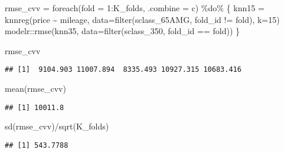\documentclass[
]{article}
\newenvironment{Shaded}{\begin{snugshade}}{\end{snugshade}}
\newcommand{\AttributeTok}[1]{\textcolor[rgb]{0.77,0.63,0.00}{#1}}
\newcommand{\DecValTok}[1]{\textcolor[rgb]{0.00,0.00,0.81}{#1}}
\newcommand{\FunctionTok}[1]{\textcolor[rgb]{0.00,0.00,0.00}{#1}}
\newcommand{\NormalTok}[1]{#1}
\newcommand{\OtherTok}[1]{\textcolor[rgb]{0.56,0.35,0.01}{#1}}
\newcommand{\SpecialCharTok}[1]{\textcolor[rgb]{0.00,0.00,0.00}{#1}}
\newcommand{\StringTok}[1]{\textcolor[rgb]{0.31,0.60,0.02}{#1}}
\begin{document}
\begin{Shaded}
\begin{Highlighting}[]
\NormalTok{rmse\_cvv }\OtherTok{=} \FunctionTok{foreach}\NormalTok{(}\AttributeTok{fold =} \DecValTok{1}\SpecialCharTok{:}\NormalTok{K\_folds, }\AttributeTok{.combine =} \StringTok{\textquotesingle{}c\textquotesingle{}}\NormalTok{) }\SpecialCharTok{\%do\%}\NormalTok{ \{}
\NormalTok{  knn15 }\OtherTok{=} \FunctionTok{knnreg}\NormalTok{(price }\SpecialCharTok{\textasciitilde{}}\NormalTok{ mileage, }\AttributeTok{data=}\FunctionTok{filter}\NormalTok{(sclass\_65AMG, fold\_id }\SpecialCharTok{!=}\NormalTok{ fold), }\AttributeTok{k=}\DecValTok{15}\NormalTok{)}
\NormalTok{  modelr}\SpecialCharTok{::}\FunctionTok{rmse}\NormalTok{(knn35, }\AttributeTok{data=}\FunctionTok{filter}\NormalTok{(sclass\_350, fold\_id }\SpecialCharTok{==}\NormalTok{ fold))}
\NormalTok{\}}

\NormalTok{rmse\_cvv}
\end{Highlighting}
\end{Shaded}

\begin{verbatim}
## [1]  9104.903 11007.894  8335.493 10927.315 10683.416
\end{verbatim}

\begin{Shaded}
\begin{Highlighting}[]
\FunctionTok{mean}\NormalTok{(rmse\_cvv)}
\end{Highlighting}
\end{Shaded}

\begin{verbatim}
## [1] 10011.8
\end{verbatim}

\begin{Shaded}
\begin{Highlighting}[]
\FunctionTok{sd}\NormalTok{(rmse\_cvv)}\SpecialCharTok{/}\FunctionTok{sqrt}\NormalTok{(K\_folds)}
\end{Highlighting}
\end{Shaded}

\begin{verbatim}
## [1] 543.7788
\end{verbatim}
\end{document}
